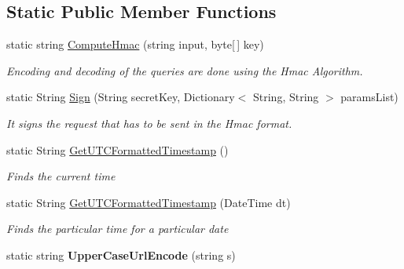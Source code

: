 \subsection*{Static Public Member Functions}
\begin{DoxyCompactItemize}
\item 
static string \hyperlink{classcom_1_1shephertz_1_1app42_1_1paas_1_1sdk_1_1csharp_1_1util_1_1_util_aa8276e9328e83dc28163392615c8e25f}{Compute\+Hmac} (string input, byte\mbox{[}$\,$\mbox{]} key)
\begin{DoxyCompactList}\small\item\em Encoding and decoding of the queries are done using the Hmac Algorithm. \end{DoxyCompactList}\item 
static String \hyperlink{classcom_1_1shephertz_1_1app42_1_1paas_1_1sdk_1_1csharp_1_1util_1_1_util_ae131ccc6c77e96007fef9e9db2511224}{Sign} (String secret\+Key, Dictionary$<$ String, String $>$ params\+List)
\begin{DoxyCompactList}\small\item\em It signs the request that has to be sent in the Hmac format. \end{DoxyCompactList}\item 
static String \hyperlink{classcom_1_1shephertz_1_1app42_1_1paas_1_1sdk_1_1csharp_1_1util_1_1_util_a37cb1b8c121d7dbc5d684073a70bd837}{Get\+U\+T\+C\+Formatted\+Timestamp} ()
\begin{DoxyCompactList}\small\item\em Finds the current time \end{DoxyCompactList}\item 
static String \hyperlink{classcom_1_1shephertz_1_1app42_1_1paas_1_1sdk_1_1csharp_1_1util_1_1_util_a0f6ab0e8c8f4130629102e7355701696}{Get\+U\+T\+C\+Formatted\+Timestamp} (Date\+Time dt)
\begin{DoxyCompactList}\small\item\em Finds the particular time for a particular date \end{DoxyCompactList}\item 
\hypertarget{classcom_1_1shephertz_1_1app42_1_1paas_1_1sdk_1_1csharp_1_1util_1_1_util_a4ae19c2396d5ca66ac75c283d3ee1253}{static string {\bfseries Upper\+Case\+Url\+Encode} (string s)}\label{classcom_1_1shephertz_1_1app42_1_1paas_1_1sdk_1_1csharp_1_1util_1_1_util_a4ae19c2396d5ca66ac75c283d3ee1253}


\end{DoxyCompactItemize}
